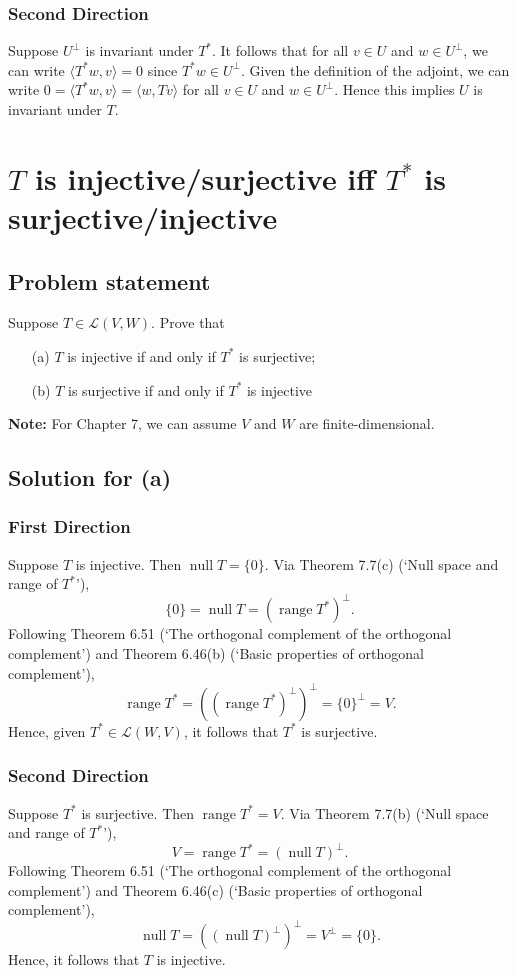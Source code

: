 \documentclass{article}
\begin{document}
\subsubsection*{Second Direction}
Suppose $U^\bot$ is invariant under $T^*$. It follows that for all $v\in U$ and $w\in U^\bot$, we can write $\langle T^* w,v\rangle=0$ since $T^* w\in U^\bot$. Given the definition of the adjoint, we can write $0=\langle T^* w,v\rangle=\langle w,Tv\rangle$ for all $v\in U$ and $w\in U^\bot$. Hence this implies $U$ is invariant under $T$.

\clearpage

\section{$T$ is injective/surjective iff $T^*$ is surjective/injective}
\subsection*{Problem statement}
Suppose $T\in\mathcal{L}(V,W)$. Prove that
\begin{enumerate}
  \item[(a)] $T$ is injective if and only if $T^*$ is surjective;
  \item[(b)] $T$ is surjective if and only if $T^*$ is injective
\end{enumerate}
\textbf{Note:} For Chapter 7, we can assume $V$ and $W$ are finite-dimensional.

\subsection*{Solution for (a)}
\subsubsection*{First Direction}
Suppose $T$ is injective. Then $\operatorname{null}T=\{0\}$. Via Theorem 7.7(c) (`Null space and range of $T^*$'), 
\[\{0\}=\operatorname{null}T=(\operatorname{range}T^*)^\bot.\]
Following Theorem 6.51 (`The orthogonal complement of the orthogonal complement') and Theorem 6.46(b) (`Basic properties of orthogonal complement'), 
\[\operatorname{range}T^*=((\operatorname{range}T^*)^\bot)^\bot=\{0\}^\bot=V.\]
Hence, given $T^*\in\mathcal{L}(W,V)$, it follows that $T^*$ is surjective.

\subsubsection*{Second Direction}
Suppose $T^*$ is surjective. Then $\operatorname{range}T^*=V$. Via Theorem 7.7(b) (`Null space and range of $T^*$'), 
\[V=\operatorname{range}T^*=(\operatorname{null}T)^\bot.\]
Following Theorem 6.51 (`The orthogonal complement of the orthogonal complement') and Theorem 6.46(c) (`Basic properties of orthogonal complement'), 
\[\operatorname{null}T=((\operatorname{null}T)^\bot)^\bot=V^\bot=\{0\}.\]
Hence, it follows that $T$ is injective.
\end{document}
